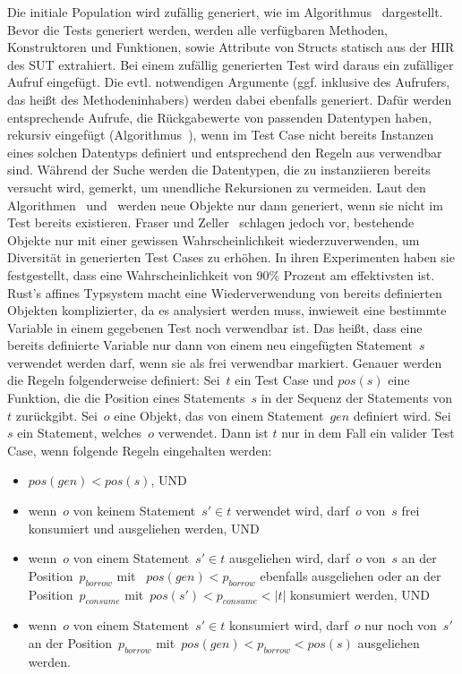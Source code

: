 \documentclass{article}
\begin{document}
Die initiale Population wird zufällig generiert, wie im Algorithmus~ dargestellt. Bevor die Tests generiert werden, werden alle verfügbaren Methoden, Konstruktoren und Funktionen, sowie Attribute von Structs statisch aus der \ac{HIR} des \ac{SUT} extrahiert. Bei einem zufällig generierten Test wird daraus ein zufälliger Aufruf eingefügt. Die evtl. notwendigen Argumente (ggf. inklusive des Aufrufers, das heißt des Methodeninhabers) werden dabei ebenfalls generiert. Dafür werden entsprechende Aufrufe, die Rückgabewerte von passenden Datentypen haben, rekursiv eingefügt (Algorithmus~), wenn im Test Case nicht bereits Instanzen eines solchen Datentyps definiert und entsprechend den Regeln aus  verwendbar sind. Während der Suche werden die Datentypen, die zu instanziieren bereits versucht wird, gemerkt, um unendliche Rekursionen zu vermeiden. Laut den Algorithmen~ und~ werden neue Objekte nur dann generiert, wenn sie nicht im Test bereits existieren. Fraser und Zeller~\cite{Fraser2012} schlagen jedoch vor, bestehende Objekte nur mit einer gewissen Wahrscheinlichkeit wiederzuverwenden, um Diversität in generierten Test Cases zu erhöhen. In ihren Experimenten haben sie festgestellt, dass eine Wahrscheinlichkeit von 90\% Prozent am effektivsten ist. Rust's affines Typsystem macht eine Wiederverwendung von bereits definierten Objekten komplizierter, da es analysiert werden muss, inwieweit eine bestimmte Variable in einem gegebenen Test noch verwendbar ist. Das heißt, dass eine bereits definierte Variable nur dann von einem neu eingefügten Statement~$s$ verwendet werden darf, wenn sie als frei verwendbar markiert. Genauer werden die Regeln folgenderweise definiert: Sei~$t$ ein Test Case und $pos(s)$ eine Funktion, die die Position eines Statements~$s$ in der Sequenz der Statements von~$t$ zurückgibt. Sei~$o$ eine Objekt, das von einem Statement~$gen$ definiert wird. Sei~$s$ ein Statement, welches~$o$ verwendet. Dann ist $t$ nur in dem Fall ein valider Test Case, wenn folgende Regeln eingehalten werden:
\begin{itemize}
    \item $pos(gen) < pos(s)$, UND
    \item wenn~$o$ von keinem Statement~$s' \in t$ verwendet wird, darf~$o$ von~$s$ frei konsumiert und ausgeliehen werden, UND
    \item wenn~$o$ von einem Statement~$s' \in t$ ausgeliehen wird, darf~$o$ von~$s$ an der Position~$p_{borrow}$ mit ~$pos(gen) < p_{borrow}$ ebenfalls ausgeliehen oder an der Position~$p_{consume}$ mit~$pos(s') < p_{consume} < \left|t\right|$ konsumiert werden, UND
    \item wenn~$o$ von einem Statement~$s' \in t$ konsumiert wird, darf~$o$ nur noch von~$s'$ an der Position~$p_{borrow}$ mit~$pos(gen) < p_{borrow} < pos(s)$ ausgeliehen werden.
\end{itemize}
\end{document}
